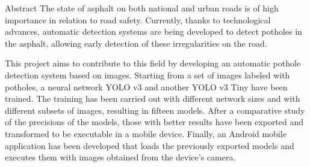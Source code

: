\begin{poliabstract}{Abstract}
\noindent
The state of asphalt on both national and urban roads is of high importance in relation to road safety. Currently, thanks to technological advances, automatic detection systems are being developed to detect potholes in the asphalt, allowing early detection of these irregularities on the road.

\doublespacing\singlespacing
\noindent
This project aims to contribute to this field by developing an automatic pothole detection system based on images. Starting from a set of images labeled with potholes, a neural network YOLO v3 and another YOLO v3 Tiny have been trained. The training has been carried out with different network sizes and with different subsets of images, resulting in fifteen models. After a comparative study of the precisions of the models, those with better results have been exported and transformed to be executable in a mobile device. Finally, an Android mobile application has been developed that loads the previously exported models and executes them with images obtained from the device's camera.
\end{poliabstract}